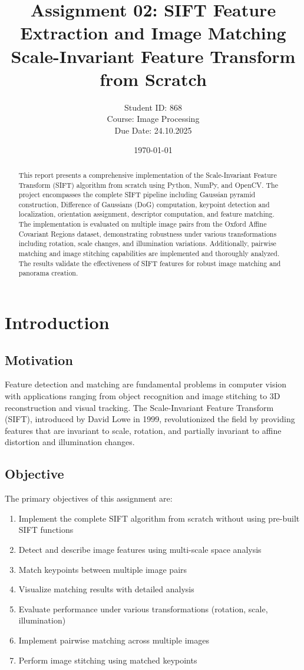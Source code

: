\documentclass[12pt,a4paper]{article}
\title{\textbf{Assignment 02: SIFT Feature Extraction and Image Matching}\\
\large Scale-Invariant Feature Transform from Scratch}
\author{Student ID: 868\\
Course: Image Processing\\
Due Date: 24.10.2025}
\date{\today}
\begin{document}
\maketitle
\thispagestyle{empty}

\begin{abstract}
This report presents a comprehensive implementation of the Scale-Invariant Feature Transform (SIFT) algorithm from scratch using Python, NumPy, and OpenCV. The project encompasses the complete SIFT pipeline including Gaussian pyramid construction, Difference of Gaussians (DoG) computation, keypoint detection and localization, orientation assignment, descriptor computation, and feature matching. The implementation is evaluated on multiple image pairs from the Oxford Affine Covariant Regions dataset, demonstrating robustness under various transformations including rotation, scale changes, and illumination variations. Additionally, pairwise matching and image stitching capabilities are implemented and thoroughly analyzed. The results validate the effectiveness of SIFT features for robust image matching and panorama creation.
\end{abstract}

\newpage
\tableofcontents
\newpage

\section{Introduction}

\subsection{Motivation}
Feature detection and matching are fundamental problems in computer vision with applications ranging from object recognition and image stitching to 3D reconstruction and visual tracking. The Scale-Invariant Feature Transform (SIFT), introduced by David Lowe in 1999, revolutionized the field by providing features that are invariant to scale, rotation, and partially invariant to affine distortion and illumination changes.

\subsection{Objective}
The primary objectives of this assignment are:
\begin{enumerate}
    \item Implement the complete SIFT algorithm from scratch without using pre-built SIFT functions
    \item Detect and describe image features using multi-scale space analysis
    \item Match keypoints between multiple image pairs
    \item Visualize matching results with detailed analysis
    \item Evaluate performance under various transformations (rotation, scale, illumination)
    \item Implement pairwise matching across multiple images
    \item Perform image stitching using matched keypoints
\end{enumerate}
\end{document}
